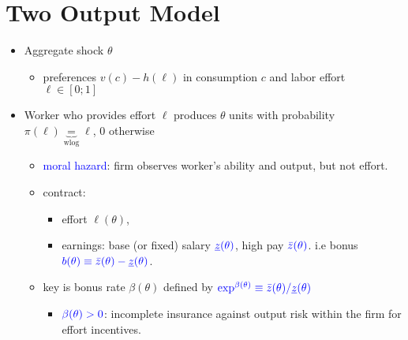 \documentclass[11pt,a4paper]{article}
\begin{document}
\section{Two Output Model}

\begin{itemize}
\item Aggregate shock $\theta$
\vspace{10pt}
\begin{itemize}
\item preferences $v (c) - h (\ell)$ in consumption $c$ and labor effort $\ell \in [0;1]$

\end{itemize}
\item Worker who provides effort $\ell$ produces $\theta$ units with probability $\pi(\ell)\underbrace{=}_{\text{wlog}}\ell$, 0 otherwise
\vspace{10pt}
\begin{itemize}
\item \textcolor{blue}{moral hazard}: firm observes worker's ability and output, but not effort.
\item contract:
\vspace{10pt}
\begin{itemize}
\item effort $\ell(\theta)$,
\item earnings: base (or fixed) salary $\textcolor{blue}{\underline{z}(\theta)}$, high pay $\textcolor{blue}{\bar{z}(\theta)}$. i.e bonus $\textcolor{blue}{b(\theta)\equiv\bar{z}(\theta)-\underline{z}(\theta)}$.
\end{itemize}
\item key is bonus rate $\beta(\theta)$ defined by $\textcolor{blue}{\exp^{\beta(\theta)}\equiv\bar{z}(\theta)/\underline{z}(\theta)}$
\vspace{10pt}
\begin{itemize}
\item $\textcolor{blue}{\beta(\theta)	>0}$: incomplete insurance against output risk within
the firm for effort incentives.
\end{itemize}
\end{itemize}
\end{itemize}
\end{document}
